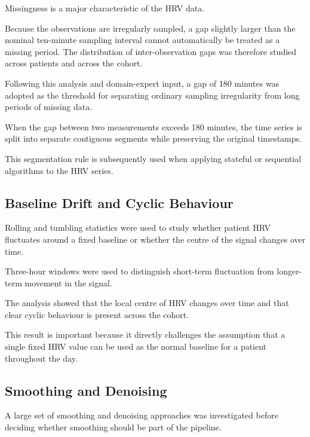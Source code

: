 \documentclass[11pt,a4paper]{article}
\begin{document}
Missingness is a major characteristic of the HRV data.

Because the observations are irregularly sampled, a gap slightly larger than
the nominal ten-minute sampling interval cannot automatically be treated as a
missing period. The distribution of inter-observation gaps was therefore
studied across patients and across the cohort.

Following this analysis and domain-expert input, a gap of 180 minutes was
adopted as the threshold for separating ordinary sampling irregularity from
long periods of missing data.

When the gap between two measurements exceeds 180 minutes, the time series is
split into separate contiguous segments while preserving the original
timestamps.

This segmentation rule is subsequently used when applying stateful or
sequential algorithms to the HRV series.

\subsection{Baseline Drift and Cyclic Behaviour}

Rolling and tumbling statistics were used to study whether patient HRV
fluctuates around a fixed baseline or whether the centre of the signal changes
over time.

Three-hour windows were used to distinguish short-term fluctuation from
longer-term movement in the signal.

The analysis showed that the local centre of HRV changes over time and that
clear cyclic behaviour is present across the cohort.

This result is important because it directly challenges the assumption that a
single fixed HRV value can be used as the normal baseline for a patient
throughout the day.

\subsection{Smoothing and Denoising}

A large set of smoothing and denoising approaches was investigated before
deciding whether smoothing should be part of the pipeline.
\end{document}
